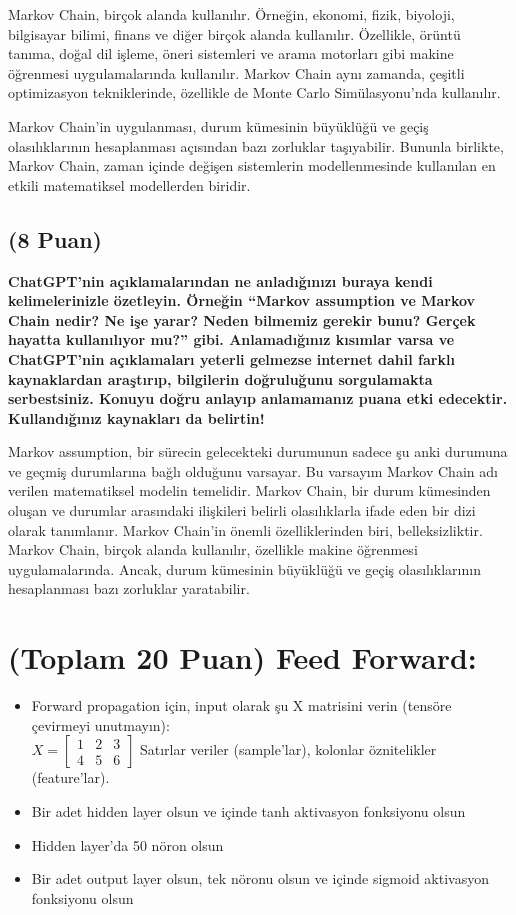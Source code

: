 \documentclass[11pt]{article}
\begin{document}
Markov Chain, birçok alanda kullanılır. Örneğin, ekonomi, fizik, biyoloji, bilgisayar bilimi, finans ve diğer birçok alanda kullanılır. Özellikle, örüntü tanıma, doğal dil işleme, öneri sistemleri ve arama motorları gibi makine öğrenmesi uygulamalarında kullanılır. Markov Chain aynı zamanda, çeşitli optimizasyon tekniklerinde, özellikle de Monte Carlo Simülasyonu'nda kullanılır.

Markov Chain'in uygulanması, durum kümesinin büyüklüğü ve geçiş olasılıklarının hesaplanması açısından bazı zorluklar taşıyabilir. Bununla birlikte, Markov Chain, zaman içinde değişen sistemlerin modellenmesinde kullanılan en etkili matematiksel modellerden biridir.

\subsection{(8 Puan)} \textbf{ChatGPT’nin açıklamalarından ne anladığınızı buraya kendi kelimelerinizle özetleyin. Örneğin ``Markov assumption ve Markov Chain nedir? Ne işe yarar? Neden bilmemiz gerekir bunu? Gerçek hayatta kullanılıyor mu?'' gibi. Anlamadığınız kısımlar varsa ve ChatGPT’nin açıklamaları yeterli gelmezse internet dahil farklı kaynaklardan araştırıp, bilgilerin doğruluğunu sorgulamakta serbestsiniz. Konuyu doğru anlayıp anlamamanız puana etki edecektir. Kullandığınız kaynakları da belirtin!}

Markov assumption, bir sürecin gelecekteki durumunun sadece şu anki durumuna ve geçmiş durumlarına bağlı olduğunu varsayar. Bu varsayım Markov Chain adı verilen matematiksel modelin temelidir. Markov Chain, bir durum kümesinden oluşan ve durumlar arasındaki ilişkileri belirli olasılıklarla ifade eden bir dizi olarak tanımlanır. Markov Chain'in önemli özelliklerinden biri, belleksizliktir. Markov Chain, birçok alanda kullanılır, özellikle makine öğrenmesi uygulamalarında. Ancak, durum kümesinin büyüklüğü ve geçiş olasılıklarının hesaplanması bazı zorluklar yaratabilir.

\section{(Toplam 20 Puan) Feed Forward:}
 
\begin{itemize}
    \item Forward propagation için, input olarak şu X matrisini verin (tensöre çevirmeyi unutmayın):\\
    $X = \begin{bmatrix}
        1 & 2 & 3\\
        4 & 5 & 6
        \end{bmatrix}$
    Satırlar veriler (sample'lar), kolonlar öznitelikler (feature'lar).
    \item Bir adet hidden layer olsun ve içinde tanh aktivasyon fonksiyonu olsun
    \item Hidden layer'da 50 nöron olsun
    \item Bir adet output layer olsun, tek nöronu olsun ve içinde sigmoid aktivasyon fonksiyonu olsun
\end{itemize}
\end{document}
